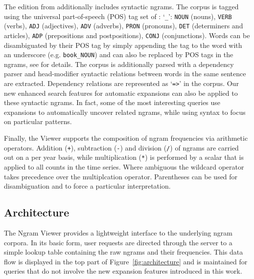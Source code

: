 \documentclass[11pt]{article}
\newcommand{\query}[1]{\texttt{#1}}
\begin{document}
The edition from  additionally includes syntactic ngrams. The corpus is tagged using the universal part-of-speech (POS) tag set of : `\query{\_}': \query{NOUN} (nouns), \query{VERB} (verbs), \query{ADJ} (adjectives), \query{ADV} (adverbs), \query{PRON} (pronouns), \query{DET} (determiners and articles), \query{ADP} (prepositions and postpositions), \query{CONJ} (conjunctions). Words can be disambiguated by their POS tag by simply appending the tag to the word with an underscore (e.g. \texttt{book\_NOUN}) and can also be replaced by POS tags in the ngrams, see  for details. The corpus is additionally parsed with a dependency parser and head-modifier syntactic relations between words in the same sentence are extracted. Dependency relations are represented as `\query{=>}' in the corpus. Our new enhanced search features for automatic expansions can also be applied to these syntactic ngrams. In fact, some of the most interesting queries use expansions to automatically uncover related ngrams, while using syntax to focus on particular patterns.

Finally, the Viewer supports the composition of ngram frequencies via arithmetic operators. Addition (\query{+}), subtraction (\query{-}) and division (\query{/}) of ngrams are carried out on a per year basis, while multiplication (\query{*}) is performed by a scalar that is applied to all counts in the time series. Where ambiguous the wildcard operator takes precedence over the multiplcation operator. Parentheses can be used for disambiguation and to force a particular interpretation.

\subsection{Architecture}
The Ngram Viewer provides a lightweight interface to the underlying ngram corpora. In its basic form, user requests are directed through the server to a simple lookup table containing the raw ngrams and their frequencies. This data flow is displayed in the top part of Figure~\ref{fig:architecture} and is maintained for queries that do not involve the new expansion features introduced in this work.
\end{document}
